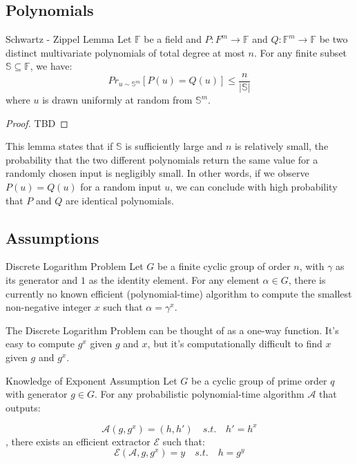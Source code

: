 \documentclass{article}
\begin{document}
\subsection{Polynomials}

\begin{lemma}{Schwartz - Zippel Lemma}{}
Let $\mathbb{F}$ be a field and $P: F^m \rightarrow \mathbb{F}$ and $Q: \mathbb{F}^m \rightarrow \mathbb{F}$ be two distinct multivariate polynomials of total degree at most $n$. For any finite subset $\mathbb{S} \subseteq \mathbb{F}$, we have:
        \begin{equation}
            Pr_{u \sim \mathbb{S}^{m}}[P(u) = Q(u)] \leq \frac{n}{|\mathbb{S}|}
        \end{equation}
where $u$ is drawn uniformly at random from $\mathbb{S}^m$.
\end{lemma}

\begin{proof}
    TBD
\end{proof}

This lemma states that if $\mathbb{S}$ is sufficiently large and $n$ is relatively small, the probability that the two different polynomials return the same value for a randomly chosen input is negligibly small. In other words, if we observe $P(u) = Q(u)$ for a random input $u$, we can conclude with high probability that $P$ and $Q$ are identical polynomials.

\subsection{Assumptions}

\begin{assumption}{Discrete Logarithm Problem}{} Let $G$ be a finite cyclic group of order $n$, with $\gamma$ as its generator and $1$ as the identity element. For any element $\alpha \in G$, there is currently no known efficient (polynomial-time) algorithm to compute the smallest non-negative integer $x$ such that $\alpha = \gamma^{x}$.
\end{assumption}

The Discrete Logarithm Problem can be thought of as a one-way function. It's easy to compute $g^{x}$ given $g$ and $x$, but it's computationally difficult to find $x$ given $g$ and $g^{x}$.

\begin{assumption}{Knowledge of Exponent Assumption}{}
Let $G$ be a cyclic group of prime order $q$ with generator $g \in G$. For any probabilistic polynomial-time algorithm $\mathcal{A}$ that outputs:

\begin{equation}
\mathcal{A}(g, g^x) = (h, h') \quad s.t. \quad h' = h^x
\end{equation}
, there exists an efficient extractor $\mathcal{E}$ such that:
\begin{equation}
\mathcal{E}(\mathcal{A}, g, g^x) = y \quad s.t. \quad h = g^y
\end{equation}
\end{assumption}
\end{document}
